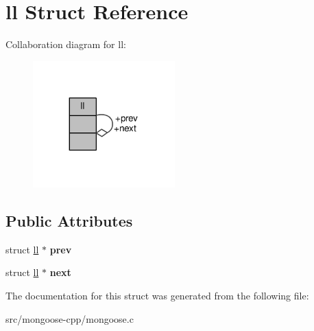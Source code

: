 \hypertarget{structll}{}\section{ll Struct Reference}
\label{structll}


Collaboration diagram for ll\+:
\nopagebreak
\begin{figure}[H]
\begin{center}
\leavevmode
\includegraphics[width=155pt]{d8/d82/structll__coll__graph}
\end{center}
\end{figure}
\subsection*{Public Attributes}
\begin{DoxyCompactItemize}
\item 
struct \hyperlink{structll}{ll} $\ast$ {\bfseries prev}\hypertarget{structll_a927117ac2e217bcbd700aba58943e0bd}{}\label{structll_a927117ac2e217bcbd700aba58943e0bd}

\item 
struct \hyperlink{structll}{ll} $\ast$ {\bfseries next}\hypertarget{structll_a651b8cda89973a23c26f1ea66d24f615}{}\label{structll_a651b8cda89973a23c26f1ea66d24f615}

\end{DoxyCompactItemize}


The documentation for this struct was generated from the following file\+:\begin{DoxyCompactItemize}
\item 
src/mongoose-\/cpp/mongoose.\+c\end{DoxyCompactItemize}
